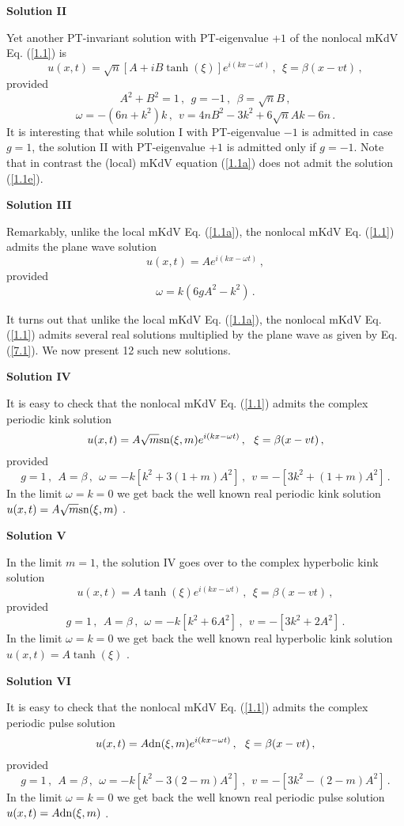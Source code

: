 \documentclass[11pt]{article}
\newcommand{\be}{\begin{equation}}
\newcommand{\ee}{\end{equation}}
\newcommand{\sn}{{\rm sn}}
\newcommand{\dn}{{\rm dn}}
\begin{document}
{\bf Solution II}

Yet another PT-invariant solution with PT-eigenvalue +$1$ of the 
nonlocal mKdV Eq. (\ref{1.1}) is
\be\label{1.1e}
u(x,t) = \sqrt{n}[A+iB\tanh(\xi)]e^{i(kx-\omega t)}\,,~~\xi = 
\beta(x-vt)\,,
\ee
provided
\be\label{1.1f}
A^2+B^2 = 1\,,~~g = -1\,,~~\beta = \sqrt{n} B\,,
\ee
\be\label{1.1g}
\omega = -(6n+k^2)k\,,~~v = 4nB^2-3k^2+6\sqrt{n} Ak-6n\,.
\ee
It is interesting that while solution I with PT-eigenvalue $-1$ is admitted 
in case $g = 1$, the solution II with PT-eigenvalue +$1$ is admitted only
if $g = -1$. Note that in contrast the (local) mKdV equation (\ref{1.1a})
does not admit the solution (\ref{1.1e}).

{\bf Solution III}

Remarkably, unlike the local mKdV Eq. (\ref{1.1a}), the nonlocal mKdV 
Eq. (\ref{1.1}) admits the plane wave solution
\be\label{7.1}
u(x,t) = A e^{i(kx-\omega t)}\,,
\ee
provided
\be\label{7.2}
\omega = k(6g A^2-k^2)\,.
\ee

It turns out that unlike the local mKdV Eq. (\ref{1.1a}), the nonlocal
mKdV Eq. (\ref{1.1}) admits several real solutions multiplied by the 
plane wave as given by Eq. (\ref{7.1}). We now present 12 such new 
solutions.

{\bf Solution IV}

It is easy to check that the nonlocal mKdV Eq. (\ref{1.1}) admits the
complex periodic kink solution
\be\label{7.3}
u(x,t) = A \sqrt{m} \sn(\xi,m) e^{i(kx-\omega t)}\,,~~\xi = \beta(x-vt)\,,
\ee
provided
\be\label{7.4}
g = 1\,,~~A = \beta\,,~~\omega = -k[k^2+3(1+m)A^2]\,,~~v = -[3k^2
+(1+m)A^2]\,.
\ee
In the limit $\omega = k = 0$ we get back the well known real periodic 
kink solution $u(x,t)=A\sqrt{m} \sn(\xi,m)$ \cite{ks1,ks3}. 

{\bf Solution V}

In the limit $m = 1$, the solution IV goes over to the complex hyperbolic 
kink solution
\be\label{7.5}
u(x,t) = A \tanh(\xi) e^{i(kx-\omega t)}\,,~~\xi = \beta(x-vt)\,,
\ee
provided
\be\label{7.6}
g = 1\,,~~A = \beta\,,~~\omega = -k[k^2+6 A^2]\,,~~v = -[3k^2
+2 A^2]\,.
\ee
In the limit $\omega = k = 0$ we get back the well known real hyperbolic 
kink solution $u(x,t)=A\tanh(\xi)$ \cite{ks1,ks3}. 

{\bf Solution VI}

It is easy to check that the nonlocal mKdV Eq. (\ref{1.1}) admits the
complex periodic pulse solution
\be\label{7.7}
u(x,t) = A \dn(\xi,m) e^{i(kx-\omega t)}\,,~~\xi = \beta(x-vt)\,,
\ee
provided
\be\label{7.8}
g = 1\,,~~A = \beta\,,~~\omega = -k[k^2-3(2-m)A^2]\,,~~v = -[3k^2
-(2-m)A^2]\,.
\ee
In the limit $\omega = k = 0$ we get back the well known real periodic 
pulse solution $u(x,t)=A\dn(\xi,m)$ \cite{ks1,ks3}. 
\end{document}
